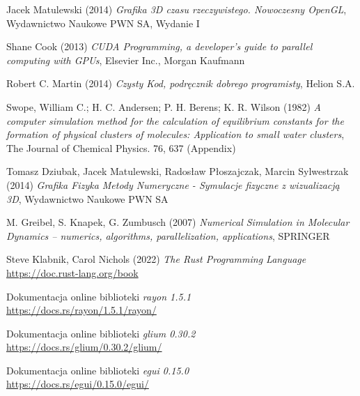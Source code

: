 \documentclass[12pt, letterpaper]{report}
\begin{document}
    \begin{thebibliography}{9}

        Jacek Matulewski (2014) 
        \emph{Grafika 3D czasu rzeczywistego. Nowoczesny OpenGL},
        Wydawnictwo Naukowe PWN SA, Wydanie I

        Shane Cook (2013) 
        \emph{CUDA Programming, a developer's guide to parallel computing with GPUs},
        Elsevier Inc., Morgan Kaufmann

        Robert C. Martin (2014) 
        \emph{Czysty Kod, podręcznik dobrego programisty},
        Helion S.A.

        Swope, William C.; H. C. Andersen; P. H. Berens; K. R. Wilson (1982) 
        \emph{A computer simulation method for the calculation of 
            equilibrium constants for the formation of physical clusters 
            of molecules: Application to small water clusters}, 
        The Journal of Chemical Physics. 76, 637 (Appendix)

        Tomasz Dziubak, Jacek Matulewski, Radosław Płoszajczak, Marcin Sylwestrzak (2014)
        \emph{Grafika Fizyka Metody Numeryczne - Symulacje fizyczne z wizualizacją 3D},
        Wydawnictwo Naukowe PWN SA

        M. Greibel, S. Knapek, G. Zumbusch (2007)
        \emph{
            Numerical Simulation in Molecular Dynamics – 
            numerics, algorithms, parallelization, applications},
        SPRINGER

        Steve Klabnik, Carol Nichols (2022)
        \emph{The Rust Programming Language} \\
        \url{https://doc.rust-lang.org/book}

        Dokumentacja online biblioteki \emph{rayon 1.5.1} \\
        \url{https://docs.rs/rayon/1.5.1/rayon/}

        Dokumentacja online biblioteki \emph{glium 0.30.2} \\
        \url{https://docs.rs/glium/0.30.2/glium/}

        Dokumentacja online biblioteki \emph{egui 0.15.0} \\
        \url{https://docs.rs/egui/0.15.0/egui/}

    \end{thebibliography}
\end{document}
